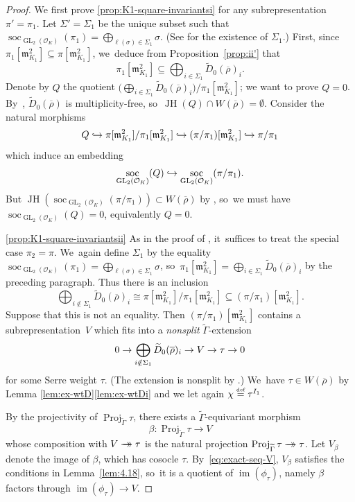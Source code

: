 \documentclass[JEP,XML,SOM,Unicode,NoFloatCountersInSection, NoEqCountersInSection,published]{cedram}
\newcommand\hto{\mathrel{\lhook\joinrel\to}}
\newcommand{\onto}{\mathchoice{\to\hspace*{-5mm}\to}{\mathrel{\hbox{$\to\hspace*{-2.85mm}\to$}}}{\to\hspace*{-3mm}\to}{\to\hspace*{-3mm}\to}}
\let\wt\widetilde
\newcommand{\defeq}{\stackrel{\textrm{\tiny{\upshape{def}}}}{=}}
\newcommand{\cO}{\mathcal{O}}
\newcommand{\fm}{\mathfrak{m}}\let\m\fm
\newcommand{\brho}{\overline{\rho}}
\DeclareMathOperator{\GL}{GL}
\DeclareMathOperator{\im}{im}
\DeclareMathOperator{\JH}{\mathrm{JH}}
\DeclareMathOperator{\Proj}{Proj}
\DeclareMathOperator{\soc}{soc}
\theoremstyle{plain}
\theoremstyle{definition}
\begin{document}
\begin{proof}

We first prove \eqref{prop:K1-square-invariantsi} for any subrepresentation $\pi' = \pi_1$.
Let $\Sigma' = \Sigma_1$ be the unique subset such that $\soc_{\GL_2(\cO_K)}(\pi_1)=\bigoplus_{\ell(\sigma)\in\Sigma_1}\sigma$.
(See \cite[Prop.\,3.2.2]{BHHMS4} for the existence of $\Sigma_1$.)
First, since $\pi_1[\fm_{K_1}^2]\subseteq \pi[\fm_{K_1}^2]$, we~deduce from Proposition~\ref{prop:ii'} that
\[
\pi_1[\m_{K_1}^2]\subseteq \bigoplus_{i\in\Sigma_1}\wt{D}_0(\brho)_i.
\]
Denote by $Q$ the quotient $\bigl(\bigoplus_{i\in\Sigma_1}\wt{D}_0(\brho)_i\bigr)/\pi_1[\m_{K_1}^2]$; we want to prove $Q=0$. By~\cite[Th.\,4.6]{HuWang2}, $\wt{D}_0(\brho)$ is multiplicity-free, so~$\JH(Q)\cap W(\brho)=\emptyset$. Consider the natural morphisms
\[
Q\hto \pi[\fm_{K_1}^2]/\pi_1[\fm_{K_1}^2]\hto (\pi/\pi_1)[\fm_{K_1}^2]\hto \pi/\pi_1
\]
which induce an embedding
\[
\soc_{\GL_2(\cO_K)}(Q)\hto \soc_{\GL_2(\cO_K)}(\pi/\pi_1).
\]
But $\JH(\soc_{\GL_2(\cO_K)}(\pi/\pi_1))\subset W(\brho)$ by \cite[Lem.\,3.2.6]{BHHMS4}, so~we must have $\soc_{\GL_2(\cO_K)}(Q)=0$, equivalently $Q=0$.

\eqref{prop:K1-square-invariantsii} As in the proof of \cite[Cor.\,3.2.5]{BHHMS4}, it~suffices to treat the special case \hbox{$\pi_2\!=\!\pi$}. We~again define $\Sigma_1$ by the equality $\soc_{\GL_2(\cO_K)}(\pi_1)=\bigoplus_{\ell(\sigma)\in\Sigma_1}\sigma$, so~$\pi_1[\fm_{K_1}^2]=\bigoplus_{i\in \Sigma_1}\widetilde{D}_0(\brho)_i$ by the preceding paragraph.
Thus there is an inclusion
\[
\bigoplus_{i\notin \Sigma_1}\wt{D}_0(\brho)_i\cong \pi[\m_{K_1}^2]/\pi_1[\m_{K_1}^2] \subseteq (\pi/\pi_1)[\m_{K_1}^2].
\]
Suppose that this is not an equality. Then $(\pi/\pi_1)[\m_{K_1}^2]$ contains a subrepresentation~$V$ which fits into a \emph{nonsplit} $\wt{\Gamma}$-extension
\begin{equation}\label{eq:exact-seq-V}
0\to \bigoplus_{i\notin \Sigma_1}\wt{D}_0(\brho)_i\to V\to \tau\ra0
\end{equation}
for some Serre weight $\tau$.
(The extension is nonsplit by \cite[Lem.\,3.2.6]{BHHMS4}.)
We~have $\tau\in W(\brho)$ by Lemma \ref{lem:ex-wtD}\eqref{lem:ex-wtDi} and we let again $\chi \defeq \tau^{I_1}$.

By the projectivity of $\Proj_{\wt{\Gamma}}\tau$, there exists a $\wt{\Gamma}$-equivariant morphism
\[
\beta:\Proj_{\wt{\Gamma}}\tau\to V
\]
whose composition with $V\onto \tau$ is the natural projection $\Proj_{\wt{\Gamma}}\tau\onto \tau$. Let $V_\beta$ denote the image of $\beta$, which has cosocle $\tau$. By~\eqref{eq:exact-seq-V}, $V_{\beta}$ satisfies the conditions in Lem\-ma~\ref{lem:4.18}, so~it is a quotient of $\im(\phi_{\tau})$, namely $\beta$ factors through $\im(\phi_{\tau})\to V$.


\end{proof}
\end{document}

